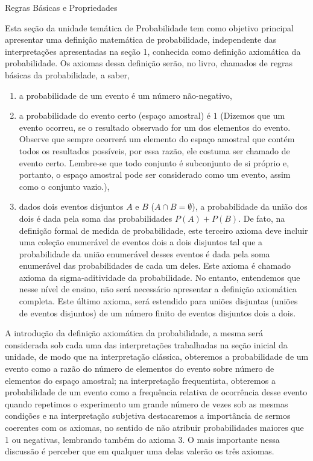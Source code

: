 \clearpage
\def\currentcolor{session1}
\begin{paginatexto}{Regras Básicas e Propriedades}{

Esta seção da unidade temática de Probabilidade tem como objetivo principal apresentar uma definição matemática de probabilidade, independente das interpretações apresentadas na seção 1, conhecida como definição axiomática da probabilidade. Os axiomas dessa definição serão, no livro, chamados de regras básicas da probabilidade, a saber,

\begin{enumerate}
\item a probabilidade de um evento é um número não-negativo,

\item a probabilidade do evento certo (espaço amostral) é $1$ (Dizemos que um evento ocorreu, se o resultado observado for um dos elementos do evento. Observe que sempre ocorrerá um elemento do espaço amostral que contém todos os resultados possíveis, por essa razão, ele costuma ser chamado de evento certo. Lembre-se que todo conjunto é subconjunto de si próprio e, portanto, o espaço amostral pode ser considerado como um evento, assim como o conjunto vazio.),

\item dados dois eventos disjuntos $A$ e $B$ ($A\cap B=\emptyset$), a probabilidade da união dos dois é dada pela soma das probabilidades $P(A)+P(B)$. De fato, na definição formal de medida de probabilidade, este terceiro axioma deve incluir uma coleção enumerável de eventos dois a dois disjuntos tal que a probabilidade da união enumerável desses eventos é dada pela soma enumerável das probabilidades de cada um deles. Este axioma é chamado axioma da sigma-aditividade da probabilidade. No entanto, entendemos que nesse nível de ensino, não será necessário apresentar a definição axiomática completa. Este último axioma, será estendido para uniões disjuntas (uniões de eventos disjuntos) de um número finito de eventos disjuntos dois a dois.
\end{enumerate}

A introdução da definição axiomática da probabilidade, a mesma será considerada sob cada uma das interpretações trabalhadas na seção inicial da unidade, de modo que na interpretação clássica, obteremos a probabilidade de um evento como a razão do número de elementos do evento sobre número de elementos do espaço amostral; na interpretação frequentista, obteremos a probabilidade de um evento como a frequência relativa de ocorrência desse evento quando repetimos o experimento um grande número de vezes sob as mesmas condições e na interpretação subjetiva destacaremos a importância de sermos coerentes com os axiomas, no sentido de não atribuir probabilidades maiores que 1 ou negativas, lembrando também do axioma 3. O mais importante nessa discussão é perceber que em qualquer uma delas valerão os três axiomas.

}
\end{paginatexto}
